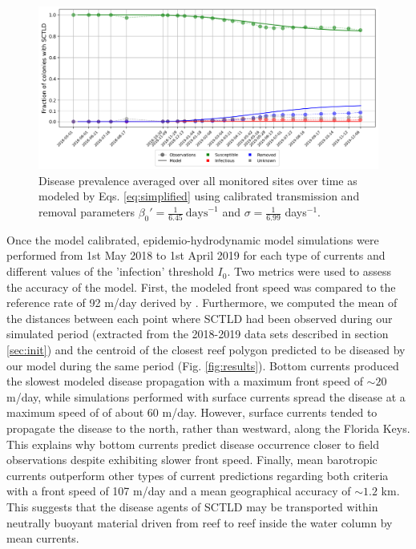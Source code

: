 \documentclass[utf8]{frontiersSCNS}
\begin{document}
\begin{figure}
    \centering
    \includegraphics[width=.95\textwidth]{figures/sir_obs.png}
    \caption{Disease prevalence averaged over all monitored sites over time as modeled by Eqs. \ref{eq:simplified} using calibrated transmission and removal parameters $\beta_0'=\frac{1}{6.45}~\text{days}^{-1}$ and $\sigma=\frac{1}{6.99}$ days$^{-1}$.}
    \label{fig:calibration}
\end{figure}

Once the model calibrated, epidemio-hydrodynamic model simulations were performed from 1st May 2018 to 1st April 2019 for each type of currents and different values of the 'infection' threshold $I_0$. Two metrics were used to assess the accuracy of the model. First, the modeled front speed was compared to the reference rate of 92 m/day derived by \cite{muller2020spatial}. Furthermore, we computed the mean of the distances between each point where SCTLD had been observed during our simulated period (extracted from the 2018-2019 data sets described in section \ref{sec:init}) and the centroid of the closest reef polygon predicted to be diseased by our model during the same period (Fig. \ref{fig:results}). Bottom currents produced the slowest modeled disease propagation with a maximum front speed of $\sim 20$ m/day, while simulations performed with surface currents spread the disease at a maximum speed of of about 60 m/day. However, surface currents tended to propagate the disease to the north, rather than westward, along the Florida Keys. This explains why bottom currents predict disease occurrence closer to field observations despite exhibiting slower front speed. Finally, mean barotropic currents outperform other types of current predictions regarding both criteria with a front speed of 107 m/day and a mean geographical accuracy of $\sim1.2$ km. This suggests that the disease agents of SCTLD may be transported within neutrally buoyant material driven from reef to reef inside the water column by mean currents.
\end{document}
